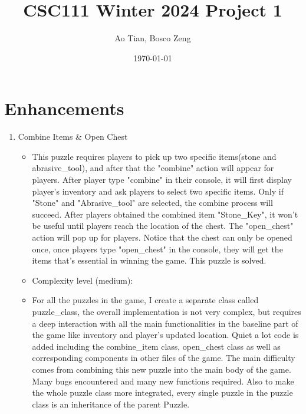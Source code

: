 \documentclass[11pt]{article}
\title{CSC111 Winter 2024 Project 1}
\author{Ao Tian, Bosco Zeng}
\date{\today}
\begin{document}
\Enhancements

\section*{Enhancements}


\begin{enumerate}

\item Combine Items & Open Chest
	\begin{itemize}
	\item This puzzle requires players to pick up two specific items(stone and abrasive_tool), and after that the "combine" action will appear for players. After player type "combine" in their console, it will first display player's inventory and ask players to select two specific items. Only if "Stone" and "Abrasive_tool" are selected, the combine process will succeed. After players obtained the combined item "Stone_Key", it won't be useful until players reach the location of the chest. The "open_chest" action will pop up for players. Notice that the chest can only be opened once, once players type "open_chest" in the console, they will get the items that's essential in winning the game. This puzzle is solved.
	\item Complexity level (medium):
	\item For all the puzzles in the game, I create a separate class called puzzle_class, the overall implementation is not very complex, but requires a deep interaction with all the main functionalities in the baseline part of the game like inventory and player's updated location. Quiet a lot code is added including the combine_item class, open_chest class as well as corresponding components in other files of the game. The main difficulty comes from combining this new puzzle into the main body of the game. Many bugs encountered and many new functions required. Also to make the whole puzzle class more integrated, every single puzzle in the puzzle class is an inheritance of the parent Puzzle.
	\end{itemize}


\end{enumerate}
\end{document}
